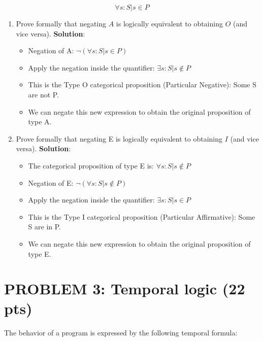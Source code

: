 \documentclass[12pt]{article}
\begin{document}
	$$\forall s : S | s \in P$$
							
	\begin{enumerate}
		\item Prove formally that negating $A$ is logically equivalent to obtaining $O$ (and vice versa).
			\textbf{Solution}:
			\begin{itemize}
				\item Negation of A: $\lnot (\forall s : S | s \in P)$
				\item Apply the negation inside the quantifier: $\exists s : S | s \notin P$
				\item This is the Type O categorical proposition (Particular Negative): Some S are not P.
				\item We can negate this new expression to obtain the original proposition of type A.
			\end{itemize}
		\item Prove formally that negating E is logically equivalent to obtaining $I$ (and vice versa).
		      \textbf{Solution}:
			  \begin{itemize}
				\item The categorical proposition of type E is: $\forall s : S | s \notin P$
				\item Negation of E: $\lnot (\forall s : S | s \notin P)$
				\item Apply the negation inside the quantifier: $\exists s : S | s \in P$
				\item This is the Type I categorical proposition (Particular Affirmative): Some S are in P.
				\item We can negate this new expression to obtain the original proposition of type E.
			  \end{itemize}
	\end{enumerate}
								    
							    
	\newpage
							    
	\section*{PROBLEM 3: Temporal logic (22 pts)}

	The behavior of a program is expressed by the following temporal formula:
							
\end{document}
